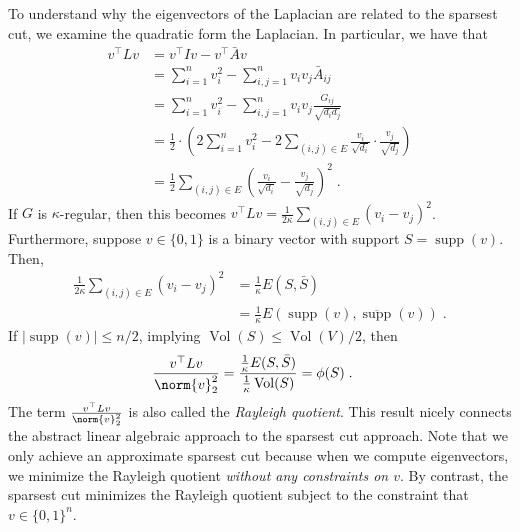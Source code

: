 \begin{remark}
To understand why the eigenvectors of the Laplacian are related to the sparsest cut, we examine the quadratic form the Laplacian. In particular, we have that
\begin{align}
    v^\top L v &= v^\top I v - v^\top \bar{A} v \\
    &= \sum_{i=1}^n v_i^2 - \sum_{i, j = 1}^n v_i v_j \bar{A}_{ij} \\
    &= \sum_{i=1}^n v_i^2 - \sum_{i, j = 1}^n v_i v_j \frac{G_{ij}}{\sqrt{d_i d_j}} \\
    &= \frac{1}{2}\cdot \left(2\sum_{i=1}^n v_i^2 - 2 \sum_{(i, j) \in E} \frac{v_i}{\sqrt{d_i}} \cdot \frac{v_j}{\sqrt{d_j}}\right) \\
    &= \frac{1}{2} \sum_{(i, j) \in E} \left( \frac{v_i}{\sqrt{d_i}} - \frac{v_j}{\sqrt{d_j}} \right)^2 \;.
\end{align}
If $G$ is $\kappa$-regular, then this becomes $v^\top L v = \frac{1}{2\kappa} \sum_{(i, j) \in E} (v_i - v_j)^2$. Furthermore, suppose $v \in \{0, 1\}$ is a binary vector with support $S = \operatorname{supp}(v)$. Then, 
\begin{align}
    \frac{1}{2\kappa} \sum_{(i, j) \in E} (v_i - v_j)^2 &= \frac{1}{\kappa} E(S, \bar{S}) \\
    &= \frac{1}{\kappa} E(\operatorname{supp}(v), \overline{\operatorname{supp}}(v)) \;.
\end{align}
If $|\operatorname{supp}(v)| \leq n/2$, implying $\operatorname{Vol}(S) \leq \operatorname{Vol}(V)/2$, then
\begin{align}
    \frac{v^\top L v}{\norm{v}^2_2} &= \frac{\frac{1}{\kappa} E(S, \bar{S})}{\frac{1}{\kappa} \operatorname{Vol}(S)} = \phi(S) \;.
\end{align}
The term $\frac{v^\top L v}{\norm{v}^2_2}$ is also called the {\it Rayleigh quotient}. This result nicely connects the abstract linear algebraic approach to the sparsest cut approach. Note that we only achieve an approximate sparsest cut because when we compute eigenvectors, we minimize the Rayleigh quotient \emph{without any constraints on $v$}. By contrast, the sparsest cut minimizes the Rayleigh quotient subject to the constraint that $v \in \{0,1\}^n$.
\end{remark}



